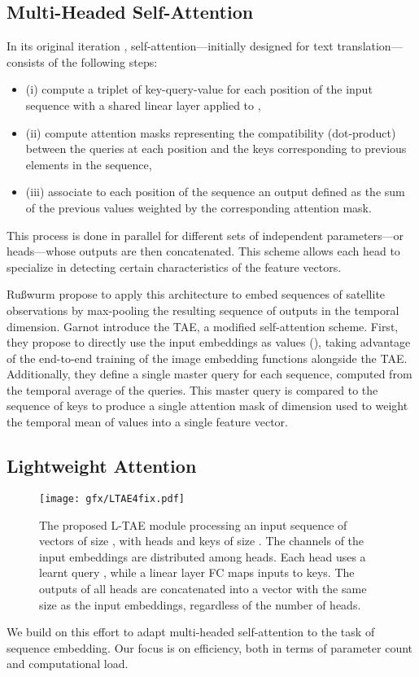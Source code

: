 \documentclass[runningheads]{llncs}
\begin{document}
\subsection{Multi-Headed Self-Attention}
\label{sec:selfattention}
In its original iteration \cite{vaswani2017attention}, self-attention---initially designed for text translation---consists of the following steps:
\begin{itemize}
    \item[](i) compute a triplet of key-query-value  for each position  of the input sequence with a shared linear layer applied to ,
    \item[](ii) compute attention masks representing the compatibility (dot-product) between the queries at each position and the keys corresponding to previous elements in the sequence,
    \item[](iii) associate to each position of the sequence an output defined as the sum of the previous values weighted by the corresponding attention mask. 
\end{itemize}
This process is done in parallel for  different sets of independent parameters---or heads---whose outputs are then concatenated. This scheme allows each head to specialize in detecting certain characteristics of the feature vectors.

Ru{\ss}wurm \etal \cite{russwurm2019self} propose to apply this architecture to embed sequences of satellite observations by max-pooling the resulting sequence of outputs in the temporal dimension.
Garnot \etal \cite{garnot2019satellite} introduce the TAE, a modified self-attention scheme. First, they propose to directly use the input embeddings as values (), taking advantage of the end-to-end training of the image embedding functions alongside the TAE. Additionally, they define a single master query  for each sequence, computed from the temporal average of the queries. This master query is compared to the sequence of keys to produce a single attention mask of dimension  used to weight the temporal mean of values into a single feature vector. 
\subsection{Lightweight Attention}
\begin{figure}[t]
    \centering
    \texttt{[image: gfx/LTAE4fix.pdf]}
    \caption{The proposed L-TAE module processing an input sequence  of  vectors of size , with  heads and keys of size .
    The channels of the input embeddings are distributed among heads. Each head uses a learnt query , while a linear layer FC maps inputs to keys. The outputs of all heads are concatenated into a vector with the same size as the input embeddings, regardless of the number of heads. }
    \label{fig:pipeline}
\end{figure}
We build on this effort to adapt multi-headed self-attention to the task of sequence embedding. Our focus is on efficiency, both in terms of parameter count and computational load. 
\end{document}
